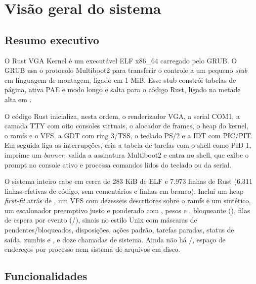 \chapter{Vis\~ao geral do sistema}
\label{cap:visao}

\section{Resumo executivo}

O Rust VGA Kernel \'e um execut\'avel ELF x86\_64 carregado pelo GRUB. O GRUB
usa o protocolo Multiboot2 para transferir o controle a um pequeno \emph{stub}
em linguagem de montagem, ligado em 1 MiB. Esse stub constr\'oi tabelas de
p\'agina, ativa PAE e modo longo e salta para o c\'odigo Rust, ligado na metade
alta em .

O c\'odigo Rust inicializa, nesta ordem, o renderizador VGA, a serial COM1, a
camada TTY com oito consoles virtuais, o alocador de frames, o heap do kernel,
o ramfs e o VFS, a GDT com ring 3/TSS, o teclado PS/2 e a IDT com PIC/PIT. Em
seguida liga as interrup\c{c}\~oes, cria a tabela de tarefas com o shell como
PID 1, imprime um \emph{banner}, valida a assinatura Multiboot2 e entra no
shell, que exibe o prompt  no console ativo e processa comandos
lidos do teclado ou da serial.

O sistema inteiro cabe em cerca de 283 KiB de ELF e 7.973 linhas de Rust
(6.311 linhas efetivas de c\'odigo, sem coment\'arios e linhas em branco).
Inclui um heap \emph{first-fit} atr\'as de , um VFS
com dezesseis descritores sobre o ramfs e um  sint\'etico, um
escalonador preemptivo justo e ponderado com , pesos e
,  bloqueante (), filas de
espera por evento (/), sinais no estilo Unix
com m\'ascaras de pendentes/bloqueados, disposi\c{c}\~oes, a\c{c}\~oes padr\~ao,
tarefas paradas, status de sa\'ida, zumbis e , e doze chamadas de
sistema. Ainda n\~ao h\'a /, espa\c{c}o de
endere\c{c}os por processo nem sistema de arquivos em disco.

\section{Funcionalidades}

